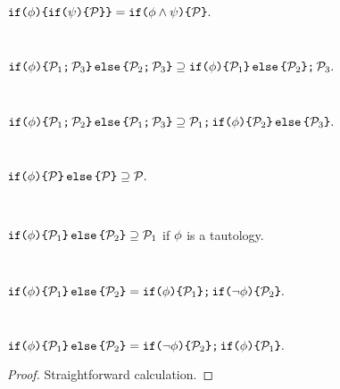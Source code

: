 \begin{lemma}
  \label{lem:if}

  \begin{enumerate*}[label=(\alph*),ref=\alph*]
    \setcounter{enumi}{3}
    \item \label{lem:if:if}
    \begin{math}
      \xIFTHEN{\aForm}{
        \xIFTHEN{\bForm}{\aPSS}{}
      }{}
      =
      \xIFTHEN{\aForm\land\bForm}{\aPSS}{}.
    \end{math}

  \\\item \label{lem:if:seq}
    \begin{math}
      \xIFTHEN{\aForm}{
        \xSEMI{\aPSS_1}{\aPSS_3}
      }{
        \xSEMI{\aPSS_2}{\aPSS_3}
      }
      \supseteq
      \xSEMI{
        \xIFTHEN{\aForm}{\aPSS_1}{\aPSS_2}
      }{
        \aPSS_3
      }.
    \end{math}

  \\\item \label{lem:seq:if}
    \begin{math}
      \xIFTHEN{\aForm}{
        \xSEMI{\aPSS_1}{\aPSS_2}
      }{
        \xSEMI{\aPSS_1}{\aPSS_3}
      }
      \supseteq
      \xSEMI{
        \aPSS_1
      }{
        \xIFTHEN{\aForm}{\aPSS_2}{\aPSS_3}
      }.
    \end{math}

  \\\item \label{lem:if:elim}
    \begin{math}
      \xIFTHEN{\aForm}{\aPSS}{\aPSS}
      \supseteq
      \aPSS.
    \end{math}

  \\\item \label{lem:if:dead}
    \begin{math}
      \xIFTHEN{\aForm}{\aPSS_1}{\aPSS_2}
      \supseteq
      \aPSS_1
    \end{math}
    if $\phi$ is a tautology.

  \\\item
    \begin{math} \label{lem:ifelse:if:if1}
      \xIFTHEN{\aForm}{\aPSS_1}{\aPSS_2}
      =
      \xSEMI{
        \xIFTHEN{\aForm}{\aPSS_1}{}
      }{
        \xIFTHEN{\lnot\aForm}{\aPSS_2}{}
      }.
    \end{math}
    
  \\\item
    \begin{math} \label{lem:ifelse:if:if2}
      \xIFTHEN{\aForm}{\aPSS_1}{\aPSS_2}
      =
      \xSEMI{
        \xIFTHEN{\lnot\aForm}{\aPSS_2}{}
      }{
        \xIFTHEN{\aForm}{\aPSS_1}{}
      }.
    \end{math}
  \end{enumerate*}      
  \vspace{-.5\baselineskip}
  \begin{proof}
    Straightforward calculation.
  \end{proof}
\end{lemma}
